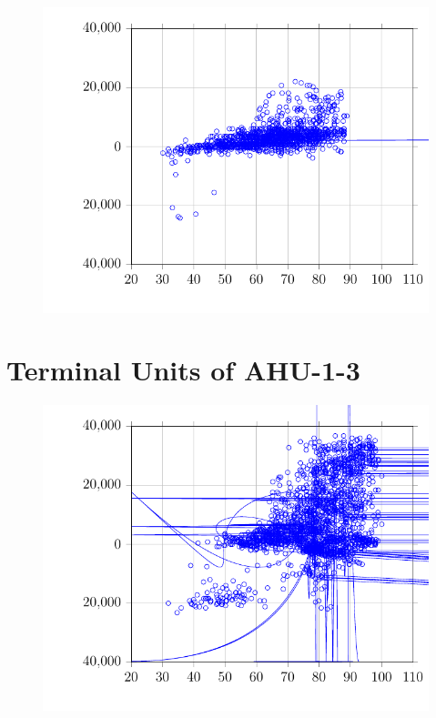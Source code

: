 \begin{figure}
\centering
\includegraphics{Plots/25/2017-06-27-1353-BtuhrvsOADryBulbTemperatureNOAAF.pdf}
\caption{}
\label{fig:2017-06-27-1353-BtuhrvsOADryBulbTemperatureNOAAF}
\end{figure}

\clearpage
\section{Terminal Units of AHU-1-3}

\begin{figure}
\centering
\includegraphics{Plots/26/2017-06-27-1355-BtuhrvsOADryBulbTemperatureNOAAF.pdf}
\caption{}
\label{fig:2017-06-27-1355-BtuhrvsOADryBulbTemperatureNOAAF}
\end{figure}

